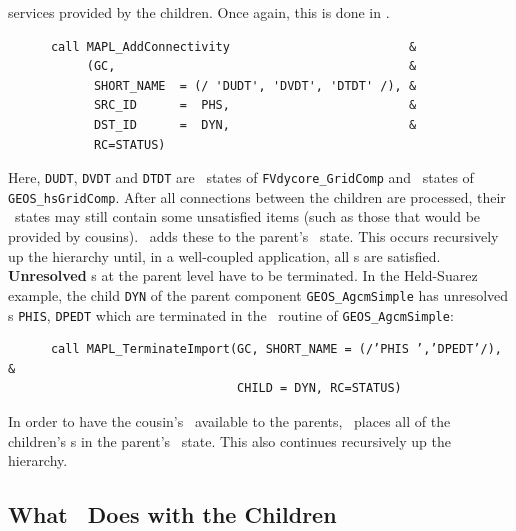 services provided by the children. Once again, this is done in \ssv.
\begin{verbatim}
      call MAPL_AddConnectivity                         &
           (GC,                                         &
            SHORT_NAME  = (/ 'DUDT', 'DVDT', 'DTDT' /), &
            SRC_ID      =  PHS,                         &
            DST_ID      =  DYN,                         &
            RC=STATUS)
\end{verbatim}
Here, \texttt{DUDT}, \texttt{DVDT} and \texttt{DTDT} are \im\ states of
\texttt{FVdycore\_GridComp} and \ex\ states of \texttt{GEOS\_hsGridComp}.
After all connections between the children are processed, their \im\
states may still contain some unsatisfied items (such as those that
would be provided by cousins). \ggn\ adds these to the
parent's \im\ state. This occurs recursively up the hierarchy
until, in a well-coupled application, all \im s are satisfied.
\textbf{Unresolved} \im s at the parent level have to be terminated.
In the Held-Suarez example, the child \texttt{DYN} of the parent component
\texttt{GEOS\_AgcmSimple} has unresolved \im s \texttt{PHIS}, \texttt{DPEDT}
which are terminated in the \ssv\ routine of \texttt{GEOS\_AgcmSimple}:
\begin{verbatim}
      call MAPL_TerminateImport(GC, SHORT_NAME = (/’PHIS ’,’DPEDT’/), &
                                CHILD = DYN, RC=STATUS)

\end{verbatim}
In order to have the cousin's \ex\ available to the parents, \ggn\
places all of the children's \ex s in the parent's \ex\
state. This also continues recursively up the hierarchy.



\subsection{What \gssv\  Does with the Children}



